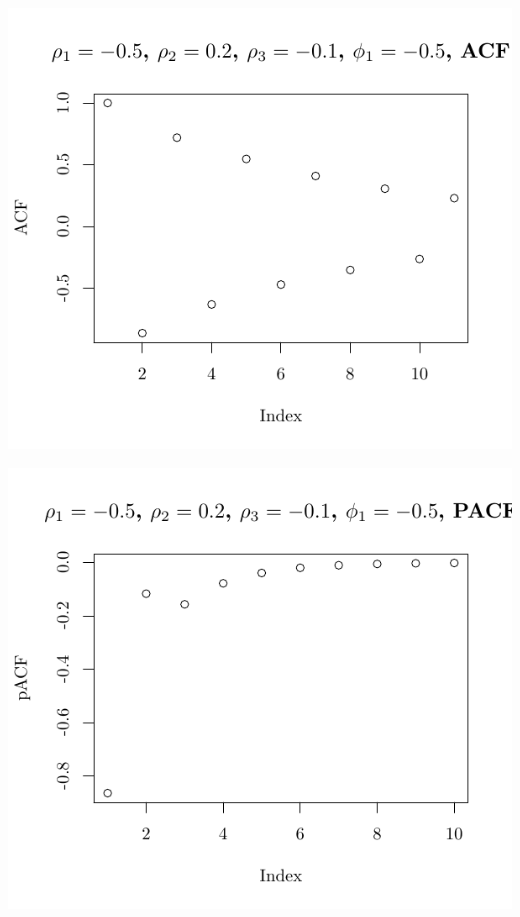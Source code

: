 \documentclass[10pt]{paper}\usepackage[]{graphicx}\usepackage[]{color}
\makeatletter
\def\maxwidth{ %
  \ifdim\Gin@nat@width>\linewidth
    \linewidth
  \else
    \Gin@nat@width
  \fi
}
\newenvironment{knitrout}{}{} %
\makeatother
\begin{document}
\begin{knitrout}
{\centering \includegraphics[width=\maxwidth]{figure/graphics-plotter-121} 

}




{\centering \includegraphics[width=\maxwidth]{figure/graphics-plotter-122} 

}





\end{knitrout}
\end{document}
